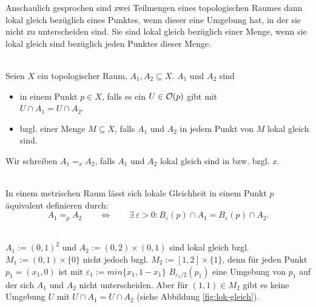     Anschaulich gesprochen sind zwei Teilmengen eines topologischen Raumes dann lokal gleich bezüglich eines Punktes, wenn dieser eine Umgebung hat, in der sie nicht zu unterscheiden sind.
    Sie sind lokal gleich bezüglich einer Menge, wenn sie lokal gleich sind bezüglich jeden Punktes dieser Menge.
%    
%
    \begin{dfn}\label{def:lok-gleich}\ \\
        Seien $X$ ein topologischer Raum, $A_1, A_2 \subseteq X$.
        $A_1$ und $A_2$ sind  
        \begin{itemize}
            \item in einem Punkt ${p \in X}$, falls es ein ${U \in \mathcal{O}(p)}$ gibt mit \\
            ${U \cap A_1 = U \cap A_2}$.
            \item bzgl. einer Menge $M \subseteq X$, falls $A_1$ und $A_2$ in jedem Punkt von $M$ lokal gleich sind.
        \end{itemize}
        Wir schreiben ${A_1 =_x A_2}$, falls $A_1$ und $A_2$ lokal gleich sind in bzw. bzgl. $x$.
    \end{dfn}
%    
    \begin{bem}\ \\
     In einem metrischen Raum lässt sich lokale Gleichheit in einem Punkt $p$ äquivalent definieren durch:
     $$ A_1 =_p A_2 \quad \quad \Leftrightarrow \quad \quad \exists\: \varepsilon > 0 : B_\varepsilon(p) \cap A_1 = B_\varepsilon(p) \cap A_2.$$
    \end{bem}
%    
    \begin{bsp}\label{bsp:lok-gleich}\ \\
     $A_1 := (0,1)^2$ und $A_2 := (0,2) \times (0,1)$ sind lokal gleich bzgl. $M_1 := (0,1) \times \{0\}$ nicht jedoch bzgl. $M_2 := [1,2] \times \{1\}$, denn für jeden Punkt $p_1 = (x_1,0)$ ist mit $\varepsilon_1 := min\{x_1,1-x_1\}$ $B_{\varepsilon_1/2}(p_1)$ eine Umgebung von $p_1$ auf der sich $A_1$ und $A_2$ nicht unterscheiden.
     Aber für $(1,1) \in M_2$ gibt es keine Umgebung $U$ mit $U \cap A_1 = U \cap A_2$ (siehe Abbildung \ref{fig:lok-gleich}).
    \end{bsp}
